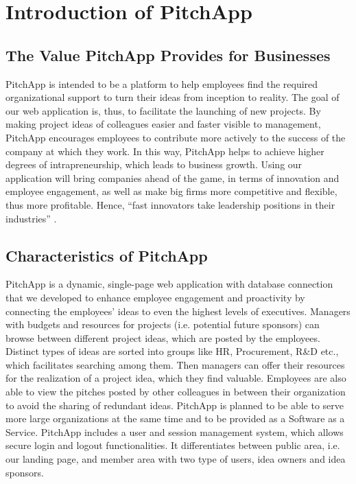 \chapter{Introduction of PitchApp}

\section{The Value PitchApp Provides for Businesses}

PitchApp is intended to be a platform to help employees find the required organizational support to turn their ideas from inception to reality. The goal of our web application is, thus, to facilitate the launching of new projects. By making project ideas of colleagues easier and faster visible to management, PitchApp encourages employees to contribute more actively to the success of the company at which they work. In this way, PitchApp helps to achieve higher degrees of intrapreneurship, which leads to business growth. Using our application will bring companies ahead of the game, in terms of innovation and
employee engagement, as well as make big firms more competitive and flexible, thus more
profitable. Hence, “fast innovators take leadership positions in their industries” \parencite{SH90}.

\section{Characteristics of PitchApp}

PitchApp is a dynamic, single-page web application with database connection that we developed to enhance employee engagement and proactivity by connecting the employees’ ideas to even the highest levels of executives. Managers with budgets and resources for projects (i.e. potential future sponsors) can browse between different project ideas, which are posted by the employees. Distinct types of ideas are sorted into groups like HR, Procurement, R\&D etc., which facilitates searching among them. Then managers can offer their resources for the realization of a project idea, which they find valuable. Employees are also able to view the pitches posted by other colleagues in between their organization to avoid the sharing of redundant ideas. PitchApp is planned to be able to serve more large organizations at the same time and to be provided as a Software as a Service. PitchApp includes a user and session management system, which allows secure login and logout functionalities. It differentiates between public area, i.e. our landing page, and member area with two type of users, idea owners and idea sponsors.

